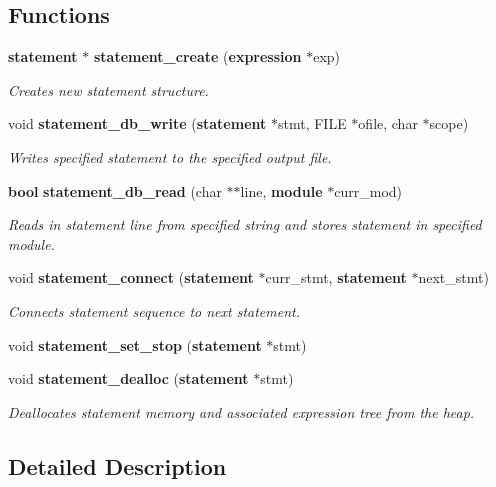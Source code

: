 \subsection*{Functions}
\begin{CompactItemize}
\item 
{\bf statement} $\ast$ {\bf statement\_\-create} ({\bf expression} $\ast$exp)
\begin{CompactList}\small\item\em Creates new statement structure.\item\end{CompactList}\item 
void {\bf statement\_\-db\_\-write} ({\bf statement} $\ast$stmt, FILE $\ast$ofile, char $\ast$scope)
\begin{CompactList}\small\item\em Writes specified statement to the specified output file.\item\end{CompactList}\item 
{\bf bool} {\bf statement\_\-db\_\-read} (char $\ast$$\ast$line, {\bf module} $\ast$curr\_\-mod)
\begin{CompactList}\small\item\em Reads in statement line from specified string and stores statement in specified module.\item\end{CompactList}\item 
void {\bf statement\_\-connect} ({\bf statement} $\ast$curr\_\-stmt, {\bf statement} $\ast$next\_\-stmt)
\begin{CompactList}\small\item\em Connects statement sequence to next statement.\item\end{CompactList}\item 
void {\bf statement\_\-set\_\-stop} ({\bf statement} $\ast$stmt)
\item 
void {\bf statement\_\-dealloc} ({\bf statement} $\ast$stmt)
\begin{CompactList}\small\item\em Deallocates statement memory and associated expression tree from the heap.\item\end{CompactList}\end{CompactItemize}


\subsection{Detailed Description}


